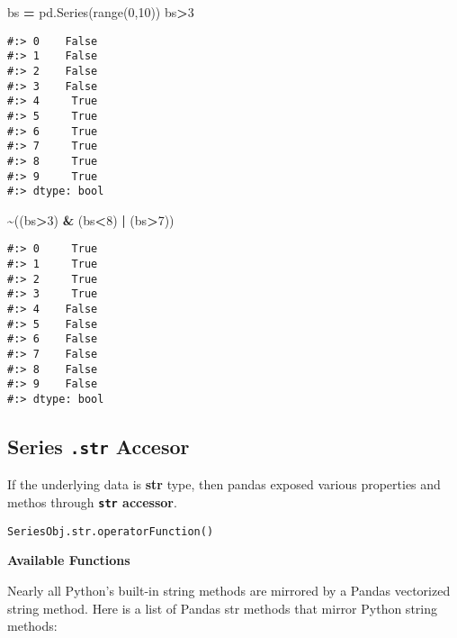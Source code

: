 \documentclass[
]{book}
\newenvironment{Shaded}{\begin{snugshade}}{\end{snugshade}}
\newcommand{\BuiltInTok}[1]{#1}
\newcommand{\DecValTok}[1]{\textcolor[rgb]{0.06,0.06,0.06}{#1}}
\newcommand{\NormalTok}[1]{#1}
\newcommand{\OperatorTok}[1]{\textcolor[rgb]{0.43,0.43,0.43}{\textbf{#1}}}
\begin{document}
\begin{Shaded}
\begin{Highlighting}[]
\NormalTok{bs }\OperatorTok{=}\NormalTok{ pd.Series(}\BuiltInTok{range}\NormalTok{(}\DecValTok{0}\NormalTok{,}\DecValTok{10}\NormalTok{))}
\NormalTok{bs}\OperatorTok{\textgreater{}}\DecValTok{3}
\end{Highlighting}
\end{Shaded}

\begin{verbatim}
#:> 0    False
#:> 1    False
#:> 2    False
#:> 3    False
#:> 4     True
#:> 5     True
#:> 6     True
#:> 7     True
#:> 8     True
#:> 9     True
#:> dtype: bool
\end{verbatim}

\begin{Shaded}
\begin{Highlighting}[]
\OperatorTok{\textasciitilde{}}\NormalTok{((bs}\OperatorTok{\textgreater{}}\DecValTok{3}\NormalTok{) }\OperatorTok{\&}\NormalTok{ (bs}\OperatorTok{\textless{}}\DecValTok{8}\NormalTok{) }\OperatorTok{|}\NormalTok{ (bs}\OperatorTok{\textgreater{}}\DecValTok{7}\NormalTok{))}
\end{Highlighting}
\end{Shaded}

\begin{verbatim}
#:> 0     True
#:> 1     True
#:> 2     True
#:> 3     True
#:> 4    False
#:> 5    False
#:> 6    False
#:> 7    False
#:> 8    False
#:> 9    False
#:> dtype: bool
\end{verbatim}

\hypertarget{series-.str-accesor}{%
\subsection{\texorpdfstring{Series \texttt{.str} Accesor}{Series .str Accesor}}\label{series-.str-accesor}}

If the underlying data is \textbf{str} type, then pandas exposed various properties and methos through \textbf{\texttt{str} accessor}.

\begin{verbatim}
SeriesObj.str.operatorFunction()
\end{verbatim}

\textbf{Available Functions}

Nearly all Python's built-in string methods are mirrored by a Pandas vectorized string method. Here is a list of Pandas str methods that mirror Python string methods:
\end{document}

